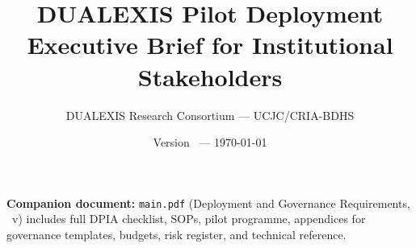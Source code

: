 \documentclass[11pt,a4paper]{article}
\title{\textbf{DUALEXIS Pilot Deployment}\\[0.3em]
       \large Executive Brief for Institutional Stakeholders}
\author{DUALEXIS Research Consortium --- UCJC/CRIA-BDHS}
\date{Version \docversion\ --- \today}
\begin{document}
\maketitle




\vspace{1em}
\noindent\small
\textbf{Companion document:} \texttt{main.pdf} (Deployment and Governance Requirements,
\docid\ v\docversion) includes full DPIA checklist, SOPs, pilot programme, appendices for
governance templates, budgets, risk register, and technical reference.
\end{document}
